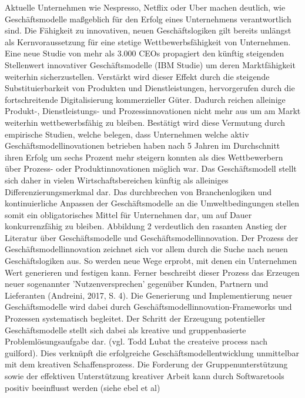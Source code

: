 Aktuelle Unternehmen wie Nespresso, Netflix oder Uber machen deutlich, wie Geschäftsmodelle maßgeblich für den Erfolg eines Unternehmens verantwortlich sind. Die Fähigkeit zu innovativen, neuen Geschäftslogiken gilt bereits unlängst als Kernvoraussetzung für eine stetige Wettbewerbsfähigkeit von Unternehmen. Eine neue Studie von mehr als 3.000 CEOs propagiert den künftig steigenden Stellenwert innovativer Geschäftsmodelle (IBM Studie) um deren Marktfähigkeit weiterhin sicherzustellen. Verstärkt wird dieser Effekt durch die steigende Substituierbarkeit von Produkten und Dienstleistungen, hervorgerufen durch die fortschreitende Digitalisierung kommerzieller Güter. Dadurch reichen alleinige Produkt-, Dienstleistungs- und Prozessinnovationen nicht mehr aus um am Markt weiterhin wettbewerbsfähig zu bleiben. Bestätigt wird diese Vermutung durch empirische Studien, welche belegen, dass Unternehmen welche aktiv Geschäftsmodellinovationen betrieben haben nach 5 Jahren im Durchschnitt ihren Erfolg um sechs Prozent mehr steigern konnten als dies Wettbewerbern über Prozess- oder Produktinnovationen möglich war. Das Geschäftsmodell stellt sich daher in vielen Wirtschaftsbereichen künftig als alleiniges Differenzierungsmerkmal dar. Das durchbrechen von Branchenlogiken und kontinuierliche Anpassen der Geschäftsmodelle an die Umweltbedingungen stellen somit ein obligatorisches Mittel für Unternehmen dar, um auf Dauer konkurrenzfähig zu bleiben. Abbildung 2 verdeutlich den rasanten Anstieg der Literatur über Geschäftsmodelle und Geschäftsmodellinnovation.
Der Prozess der Geschäftsmodellinnovation zeichnet sich vor allem durch die Suche nach neuen Geschäftslogiken aus. So werden neue Wege erprobt, mit denen ein Unternehmen Wert generieren und festigen kann. Ferner beschreibt dieser Prozess das Erzeugen neuer sogenannter ’Nutzenversprechen’ gegenüber Kunden, Partnern und Lieferanten (Andreini, 2017, S. 4). Die Generierung und Implementierung neuer Geschäftsmodelle wird dabei durch Geschäftsmodellinnovation-Frameworks und Prozessen systematisch begleitet. Der Schritt der Erzeugung potentieller Geschäftsmodelle stellt sich dabei als kreative und gruppenbasierte Problemlösungsaufgabe dar. (vgl. Todd Lubat the createive process nach guilford). Dies verknüpft die erfolgreiche Geschäftsmodellentwicklung unmittelbar mit dem kreativen Schaffensprozess. Die Forderung der Gruppenunterstützung sowie der effektiven Unterstützung kreativer Arbeit kann durch Softwaretools positiv beeinflusst werden (siehe ebel et al)
